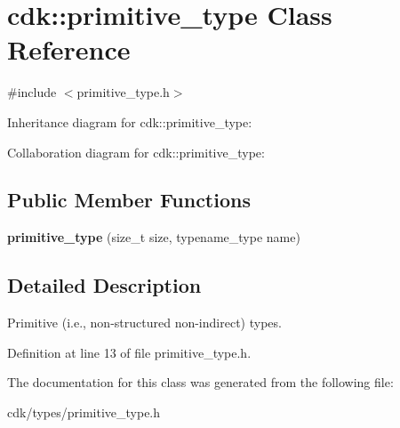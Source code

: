 \section{cdk\+:\+:primitive\+\_\+type Class Reference}
\label{classcdk_1_1primitive__type}


{\ttfamily \#include $<$primitive\+\_\+type.\+h$>$}



Inheritance diagram for cdk\+:\+:primitive\+\_\+type\+:


Collaboration diagram for cdk\+:\+:primitive\+\_\+type\+:
\subsection*{Public Member Functions}
\begin{DoxyCompactItemize}
\item 
\mbox{\label{classcdk_1_1primitive__type_abe8e5b815e907cfcb0078c13248078d5}} 
{\bfseries primitive\+\_\+type} (size\+\_\+t size, typename\+\_\+type name)
\end{DoxyCompactItemize}


\subsection{Detailed Description}
Primitive (i.\+e., non-\/structured non-\/indirect) types. 

Definition at line 13 of file primitive\+\_\+type.\+h.



The documentation for this class was generated from the following file\+:\begin{DoxyCompactItemize}
\item 
cdk/types/primitive\+\_\+type.\+h\end{DoxyCompactItemize}
